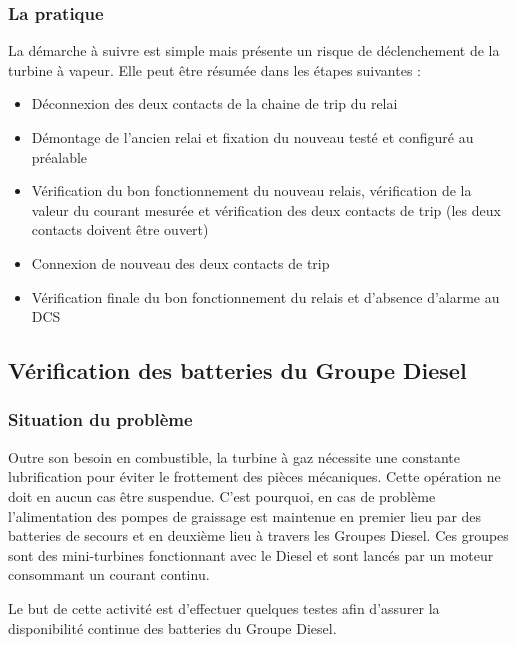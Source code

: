 \subsubsection{La pratique}
La démarche à suivre est simple mais présente un risque de déclenchement de la turbine à vapeur. Elle peut être résumée dans les étapes suivantes :

\begin{itemize}
\item Déconnexion des deux contacts de la chaine de trip du relai
\item Démontage de l'ancien relai et fixation du nouveau testé et configuré au préalable
\item Vérification du bon fonctionnement du nouveau relais, vérification de la valeur du courant mesurée et vérification des deux contacts de trip (les deux contacts doivent être ouvert)
\item Connexion de nouveau des deux contacts de trip
\item Vérification  finale du bon fonctionnement du relais et d'absence d'alarme au DCS
\end{itemize}
\subsection{Vérification des batteries du Groupe Diesel}
\subsubsection{Situation du problème}
Outre son besoin en combustible, la turbine à gaz nécessite une constante lubrification pour éviter le frottement des pièces mécaniques. Cette opération ne  doit en aucun cas être suspendue. C'est pourquoi, en cas de problème l'alimentation des pompes de graissage est maintenue en premier lieu  par des batteries de secours et en deuxième lieu à travers les Groupes Diesel. Ces groupes sont des mini-turbines fonctionnant avec le Diesel et sont lancés par un moteur consommant un courant continu. 

Le but de cette activité est d'effectuer quelques testes afin d'assurer la disponibilité continue des batteries du Groupe Diesel.
